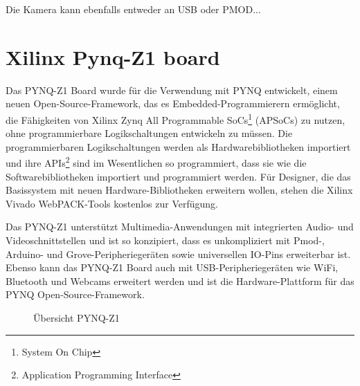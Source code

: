 \documentclass[a4paper]{report}
\begin{document}
Die Kamera kann ebenfalls entweder an USB oder PMOD...


\section{Xilinx Pynq-Z1 board}
Das PYNQ-Z1 Board wurde für die Verwendung mit PYNQ entwickelt, einem neuen Open-Source-Framework, das es Embedded-Programmierern ermöglicht, die Fähigkeiten von Xilinx Zynq All Programmable SoCs\footnote{System On Chip} (APSoCs) zu nutzen, ohne programmierbare Logikschaltungen entwickeln zu müssen. Die programmierbaren Logikschaltungen werden als Hardwarebibliotheken importiert und  ihre APIs\footnote{Application Programming Interface} sind im Wesentlichen so programmiert, dass sie wie die Softwarebibliotheken importiert und programmiert werden. Für Designer, die das Basissystem mit neuen Hardware-Bibliotheken erweitern wollen, stehen die Xilinx Vivado WebPACK-Tools kostenlos zur Verfügung.

Das PYNQ-Z1 unterstützt Multimedia-Anwendungen mit integrierten Audio- und Videoschnittstellen und ist so konzipiert, dass es unkompliziert mit Pmod-, Arduino- und Grove-Peripheriegeräten sowie universellen IO-Pins erweiterbar ist.
Ebenso kann das PYNQ-Z1 Board auch mit USB-Peripheriegeräten wie WiFi, Bluetooth und Webcams erweitert werden und ist die Hardware-Plattform für das PYNQ Open-Source-Framework.

	\begin{figure}[H]
	\centering
	\caption{Übersicht PYNQ-Z1}
	\label{Übersicht PYNQ-Z1}
	\end{figure}
\end{document}

